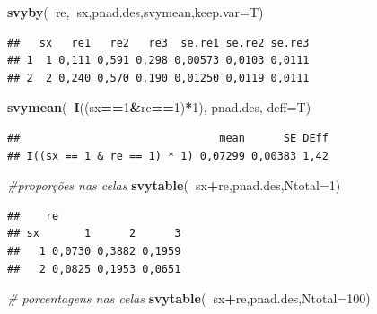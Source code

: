 \documentclass[]{book}
\newenvironment{Shaded}{\begin{snugshade}}{\end{snugshade}}
\newcommand{\KeywordTok}[1]{\textcolor[rgb]{0.13,0.29,0.53}{\textbf{#1}}}
\newcommand{\DataTypeTok}[1]{\textcolor[rgb]{0.13,0.29,0.53}{#1}}
\newcommand{\DecValTok}[1]{\textcolor[rgb]{0.00,0.00,0.81}{#1}}
\newcommand{\CommentTok}[1]{\textcolor[rgb]{0.56,0.35,0.01}{\textit{#1}}}
\newcommand{\OperatorTok}[1]{\textcolor[rgb]{0.81,0.36,0.00}{\textbf{#1}}}
\newcommand{\NormalTok}[1]{#1}
\theoremstyle{definition}
\theoremstyle{definition}
\theoremstyle{definition}
\theoremstyle{remark}
\begin{document}
\begin{Shaded}
\begin{Highlighting}[]
\KeywordTok{svyby}\NormalTok{(}\OperatorTok{~}\NormalTok{re,}\OperatorTok{~}\NormalTok{sx,pnad.des,svymean,}\DataTypeTok{keep.var=}\NormalTok{T)}
\end{Highlighting}
\end{Shaded}

\begin{verbatim}
##   sx   re1   re2   re3  se.re1 se.re2 se.re3
## 1  1 0,111 0,591 0,298 0,00573 0,0103 0,0111
## 2  2 0,240 0,570 0,190 0,01250 0,0119 0,0111
\end{verbatim}

\begin{Shaded}
\begin{Highlighting}[]
\KeywordTok{svymean}\NormalTok{(}\OperatorTok{~}\KeywordTok{I}\NormalTok{((sx}\OperatorTok{==}\DecValTok{1}\OperatorTok{&}\NormalTok{re}\OperatorTok{==}\DecValTok{1}\NormalTok{)}\OperatorTok{*}\DecValTok{1}\NormalTok{), pnad.des, }\DataTypeTok{deff=}\NormalTok{T)}
\end{Highlighting}
\end{Shaded}

\begin{verbatim}
##                               mean      SE DEff
## I((sx == 1 & re == 1) * 1) 0,07299 0,00383 1,42
\end{verbatim}

\begin{Shaded}
\begin{Highlighting}[]
\CommentTok{#proporções nas celas}
\KeywordTok{svytable}\NormalTok{(}\OperatorTok{~}\NormalTok{sx}\OperatorTok{+}\NormalTok{re,pnad.des,}\DataTypeTok{Ntotal=}\DecValTok{1}\NormalTok{)}
\end{Highlighting}
\end{Shaded}

\begin{verbatim}
##    re
## sx       1      2      3
##   1 0,0730 0,3882 0,1959
##   2 0,0825 0,1953 0,0651
\end{verbatim}

\begin{Shaded}
\begin{Highlighting}[]
\CommentTok{# porcentagens nas celas}
\KeywordTok{svytable}\NormalTok{(}\OperatorTok{~}\NormalTok{sx}\OperatorTok{+}\NormalTok{re,pnad.des,}\DataTypeTok{Ntotal=}\DecValTok{100}\NormalTok{)}
\end{Highlighting}
\end{Shaded}
\end{document}
